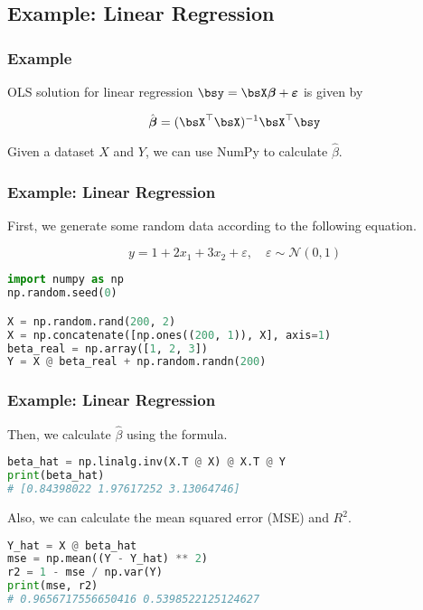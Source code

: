 \documentclass[beamer, en, version=2.0]{huangfusl-template}
\begin{document}
    \subsection{Example: Linear Regression}
    \begin{frame}
        \frametitle{Example}

        OLS solution for linear regression $\bsy = \bsX\boldsymbol{\beta} + \boldsymbol\varepsilon$ is given by

        \begin{equation}
            \hat{\boldsymbol\beta} = (\bsX^\top \bsX)^{-1}\bsX^\top \bsy
        \end{equation}

        Given a dataset $X$ and $Y$, we can use NumPy to calculate $\hat\beta$.
    \end{frame}
    \begin{frame}[fragile]
        \frametitle{Example: Linear Regression}

        First, we generate some random data according to the following equation.

        \begin{equation}
            y = 1 + 2x_1 + 3x_2 + \varepsilon, \quad \varepsilon \sim \mathcal{N}(0, 1)
        \end{equation}

\begin{lstlisting}[language=python]
import numpy as np
np.random.seed(0)

X = np.random.rand(200, 2)
X = np.concatenate([np.ones((200, 1)), X], axis=1)
beta_real = np.array([1, 2, 3])
Y = X @ beta_real + np.random.randn(200)
\end{lstlisting}
    \end{frame}
    \begin{frame}[fragile]
        \frametitle{Example: Linear Regression}

        Then, we calculate $\hat\beta$ using the formula.

\begin{lstlisting}[language=python]
beta_hat = np.linalg.inv(X.T @ X) @ X.T @ Y
print(beta_hat)
# [0.84398022 1.97617252 3.13064746]
\end{lstlisting}

        Also, we can calculate the mean squared error (MSE) and $R^2$.

\begin{lstlisting}[language=python]
Y_hat = X @ beta_hat
mse = np.mean((Y - Y_hat) ** 2)
r2 = 1 - mse / np.var(Y)
print(mse, r2)
# 0.9656717556650416 0.5398522125124627
\end{lstlisting}

    \end{frame}
\end{document}
